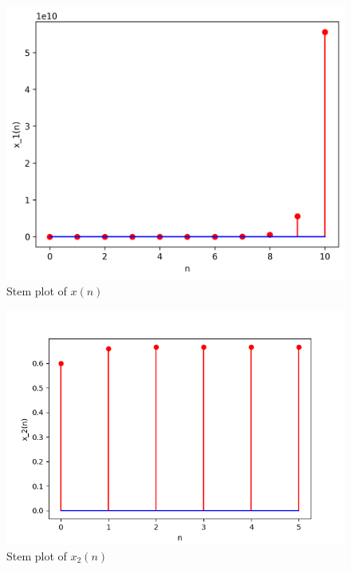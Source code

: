 \documentclass[journal,12pt,twocolumn]{IEEEtran}
\theoremstyle{remark}
\begin{document}
\begin{figure}[h!]
    \centering
    \includegraphics[width=\columnwidth]{figs/plot.png}
    \caption{Stem plot of $x(n)$}
    \label{fig:sr2}
\end{figure}
\begin{figure}[h!]
    \centering
    \includegraphics[width=\columnwidth]{figs/plot1.png}
    \caption{Stem plot of $x_2(n)$}
    \label{fig:sr7}
\end{figure}
\end{document}
